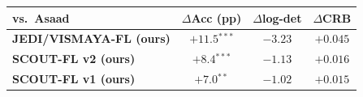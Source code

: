 \begin{tabular}{@{}l c c c@{}}
\toprule
vs.\ Asaad~\cite{asaad2025} & $\Delta$Acc (pp) & $\Delta$log-det & $\Delta$CRB \\
\midrule
\textbf{JEDI/VISMAYA-FL (ours)} & $+11.5$$^{***}$ & $-3.23$ & $+0.045$ \\
\textbf{SCOUT-FL v2 (ours)} & $+8.4$$^{***}$ & $-1.13$ & $+0.016$ \\
\textbf{SCOUT-FL v1 (ours)} & $+7.0$$^{**}$ & $-1.02$ & $+0.015$ \\
\bottomrule
\end{tabular}